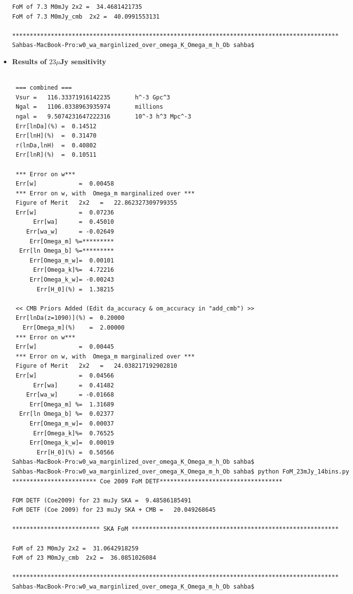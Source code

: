 \documentclass[11pt]{amsart}
\begin{document}
\begin{itemize}
\begin{verbatim}
FoM of 7.3 M0mJy 2x2 =  34.4681421735
FoM of 7.3 M0mJy_cmb  2x2 =  40.0991553131

*********************************************************************************************
Sahbas-MacBook-Pro:w0_wa_marginlized_over_omega_K_Omega_m_h_Ob sahba$
\end{verbatim}

\item \textbf{ Results of $23 \mu $Jy sensitivity} 



\begin{verbatim}

 === combined ===
 Vsur =   116.33371916142235       h^-3 Gpc^3
 Ngal =   1106.0338963935974       millions
 ngal =   9.5074231647222316       10^-3 h^3 Mpc^-3
 Err[lnDa](%) =  0.14512
 Err[lnH](%)  =  0.31470
 r(lnDa,lnH)  =  0.40802
 Err[lnR](%)  =  0.10511

 *** Error on w***
 Err[w]            =  0.00458
 *** Error on w, with  Omega_m marginalized over ***
 Figure of Merit   2x2   =   22.862327309799355
 Err[w]            =  0.07236
      Err[wa]      =  0.45010
    Err[wa_w]      = -0.02649
     Err[Omega_m] %=*********
  Err[ln Omega_b] %=*********
     Err[Omega_m_w]=  0.00101
      Err[Omega_k]%=  4.72216
     Err[Omega_k_w]= -0.00243
       Err[H_0](%) =  1.38215

 << CMB Priors Added (Edit da_accuracy & om_accuracy in "add_cmb") >>
 Err[lnDa(z=1090)](%) =  0.20000
   Err[Omega_m](%)    =  2.00000
 *** Error on w***
 Err[w]            =  0.00445
 *** Error on w, with  Omega_m marginalized over ***
 Figure of Merit   2x2   =   24.038217192902810
 Err[w]            =  0.04566
      Err[wa]      =  0.41482
    Err[wa_w]      = -0.01668
     Err[Omega_m] %=  1.31689
  Err[ln Omega_b] %=  0.02377
     Err[Omega_m_w]=  0.00037
      Err[Omega_k]%=  0.76525
     Err[Omega_k_w]=  0.00019
       Err[H_0](%) =  0.50566
Sahbas-MacBook-Pro:w0_wa_marginlized_over_omega_K_Omega_m_h_Ob sahba$
Sahbas-MacBook-Pro:w0_wa_marginlized_over_omega_K_Omega_m_h_Ob sahba$ python FoM_23mJy_14bins.py
************************ Coe 2009 FoM DETF***********************************

FOM DETF (Coe2009) for 23 muJy SKA =  9.48586185491
FoM DETF (Coe 2009) for 23 muJy SKA + CMB =   20.049268645

************************* SKA FoM ***********************************************************

FoM of 23 M0mJy 2x2 =  31.0642918259
FoM of 23 M0mJy_cmb  2x2 =  36.0851026084

*********************************************************************************************
Sahbas-MacBook-Pro:w0_wa_marginlized_over_omega_K_Omega_m_h_Ob sahba$
\end{verbatim}





\end{itemize}
\end{document}
